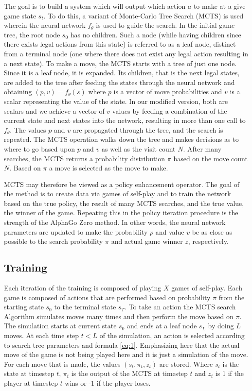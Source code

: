 \documentclass[english]{article}
\begin{document}
The goal is to build a system which will output which action $a$ to make at a
give game state $s_t$. To do this, a variant of Monte-Carlo Tree Search (MCTS)
is used wherein the neural
network $f_{\theta}$ is used to guide the search. In the initial
game tree, the root node $s_0$ has no children. Such a node (while having
children since there exists legal actions from this state) is referred to as a
leaf node, distinct from a terminal node (one where there does not exist any
legal action resulting in a next state). To make a move, the MCTS starts with a
tree of just one node. Since it is a leaf node, it is expanded. Its children,
that is the next legal states, are added to the tree after feeding the states
through the neural network and obtaining $(p, v) = f_{\theta}(s)$ where $p$ is a
vector of move probabilities and $v$ is a scalar representing the value of the
state. In our modified version, both are scalars and we achieve a vector of $v$
values by feeding a combination of the current state and next states into the
network, resulting in more than one call to $f_{\theta}$. The values $p$ and $v$
are propagated through the tree, and the search is repeated. The MCTS operation
walks down the tree and makes decisions as to where to go based upon $p$ and $v$
as well as the visit count $N$. After many searches, the MCTS returns a
probability distribution $\pi$ based on the move count $N$. Based on $\pi$ a
move is selected as the move to make.

MCTS may therefore be viewed as a policy enhancement operator. The goal of the
method is to create data via games of self-play and to train the network based
on the true policy, the result of many MCTS searches, and the true value, the
winner of the game. Repeating this in the policy
iteration procedure is the strength of the AlphaGo Zero method. In
other words, the neural network parameters are updated to make the
probability $p$ and value $v$ be as close as possible to the search
probability $\pi$ and actual game winner $z$, respectively.

\subsection{Training}
Each iteration of the training is composed of playing $X$ games of self-play. Each game is composed of actions that are
performed based on probability $\pi$ from the starting state $s_{0}$
to the terminal state $s_{T}$. To take an action the MCTS search
Algorithm simulates moves many times and then perform the move
based on $\pi$. The simulation starts at current state $s_0$ and ends
at a leaf node $s_{L}$ by doing $L$ moves. At each time step $t<L$
of the simulation, an action is selected according to search tree
parameters and formula \ref{eq:1}. Emphasizing here that the actual
move of the game is not being played here and it is just a simulation
of the move. For each move that is made, the values $(s_t, \pi_t, z_t)$ are stored.
Where $s_t$ is the state at timestep $t$, $\pi_t$ is the output of the MCTS at
timestep $t$ and $z_t$ is 1 if the player at timestep $t$ wins or -1 if the
player loses.
\end{document}
